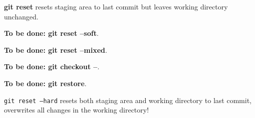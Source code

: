 %

\textbf{git reset} resets staging area to last commit but leaves working directory unchanged.

{\color{red} \textbf{To be done: git reset --soft}}.

{\color{red} \textbf{To be done: git reset --mixed}}.

{\color{red} \textbf{To be done: git checkout --}}.

{\color{red} \textbf{To be done: git restore}}.

\texttt{git reset --hard} resets both staging area and working directory to last commit, overwrites all changes in the working directory!


%